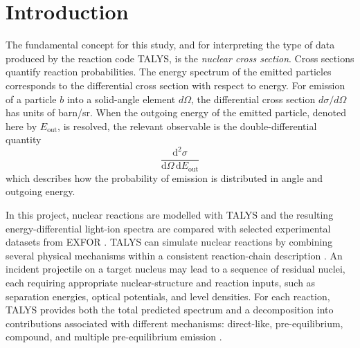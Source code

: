 \section{Introduction}

The fundamental concept for this study, and for interpreting the type of data produced by the reaction code TALYS, is the \emph{nuclear cross section}. Cross sections quantify reaction probabilities. The energy spectrum of the emitted particles corresponds to the differential cross section with respect to energy. For emission of a particle \(b\) into a solid-angle element \(d\Omega\), the differential cross section \(d\sigma/d\Omega\) has units of barn/sr. When the outgoing energy of the emitted particle, denoted here by \(E_{\mathrm{out}}\), is resolved, the relevant observable is the double-differential quantity
%
\begin{equation}
\frac{\mathrm{d}^{2}\sigma}{\mathrm{d}\Omega\, \mathrm{d}E_{\mathrm{out}}}
\label{eq:ddxs}
\end{equation}
%
which describes how the probability of emission is distributed in angle and outgoing energy.

In this project, nuclear reactions are modelled with TALYS and the resulting energy-differential light-ion spectra are compared with selected experimental datasets from EXFOR \cite{koning2025talys,iaea_exfor}. TALYS can simulate nuclear reactions by combining several physical mechanisms within a consistent reaction-chain description \cite{koning2025talys}. An incident projectile on a target nucleus may lead to a sequence of residual nuclei, each requiring appropriate nuclear-structure and reaction inputs, such as separation energies, optical potentials, and level densities. For each reaction, TALYS provides both the total predicted spectrum and a decomposition into contributions associated with different mechanisms: direct-like, pre-equilibrium, compound, and multiple pre-equilibrium emission \cite{koning2025talys}.
